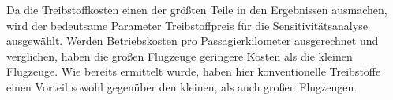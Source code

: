 Da die Treibstoffkosten einen der größten Teile in den Ergebnissen ausmachen, 
wird der bedeutsame Parameter Treibstoffpreis für die Sensitivitätsanalyse ausgewählt.
%
Werden Betriebskosten pro Passagierkilometer ausgerechnet und verglichen, 
haben die großen Flugzeuge geringere Kosten als die kleinen Flugzeuge.
Wie bereits ermittelt wurde, haben hier konventionelle Treibstoffe %
einen Vorteil sowohl gegenüber den kleinen, als auch großen Flugzeugen.

